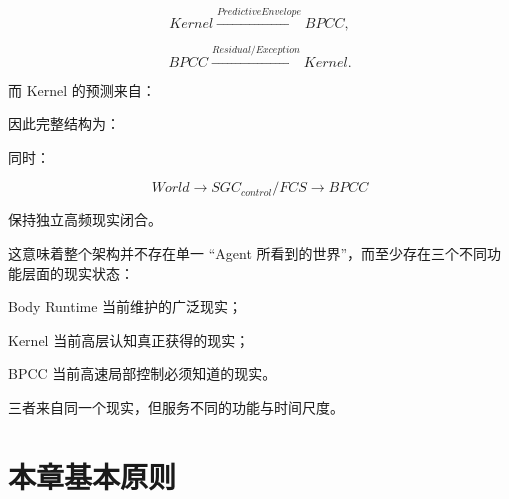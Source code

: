\[
Kernel
\xrightarrow{
PredictiveEnvelope
}
BPCC,
\]

\[
BPCC
\xrightarrow{
Residual/Exception
}
Kernel.
\]

而 Kernel 的预测来自：

\begin{statementbox}
\centering
{}
\end{statementbox}

因此完整结构为：

\begin{statementbox}
\centering
{}
\end{statementbox}

同时：

\[
World
\rightarrow
SGC_{control}/FCS
\rightarrow
BPCC
\]

保持独立高频现实闭合。

这意味着整个架构并不存在单一 ``Agent 所看到的世界''，而至少存在三个不同功能层面的现实状态：

\begin{statementbox}
\centering
{}
\end{statementbox}

Body Runtime 当前维护的广泛现实；

\begin{statementbox}
\centering
{}
\end{statementbox}

Kernel 当前高层认知真正获得的现实；

\begin{statementbox}
\centering
{}
\end{statementbox}

BPCC 当前高速局部控制必须知道的现实。

三者来自同一个现实，但服务不同的功能与时间尺度。

\section{本章基本原则}

